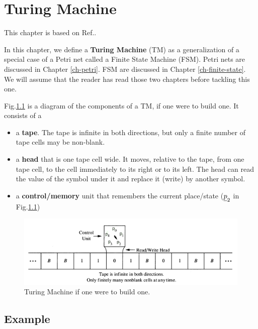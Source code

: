 \chapter{Turing Machine}
\label{ch-turing}

\newcommand{\TA}[0]{\Sigma^+}

This chapter is based on Ref.\cite{wiki-turing-machine}.

In this chapter, we define a {\bf Turing Machine} (TM) as
 a generalization
of a special case of a Petri net called a Finite
State Machine (FSM).
Petri nets are discussed in Chapter \ref{ch-petri}. FSM are discussed
in Chapter \ref{ch-finite-state}. We will assume
that the reader has read those two chapters before tackling this one.

Fig.\ref{fig-turing-phsical} is
a diagram of the components
of a TM, if one were to build one.
It consists of a 
\begin{itemize}
\item
a {\bf tape}. The tape is infinite in both directions,
but only a finite number of tape cells may be non-blank.
\item
a {\bf head}
that is one tape cell wide. It moves, relative to the tape,  from one tape cell, 
to the cell immediately to its right or to its left.
The head can read the value of the symbol under it and replace
it (write) by another symbol.
\item a {\bf control/memory} unit that remembers 
the current place/state ($\rvp_2$ in Fig.\ref{fig-turing-phsical})
\end{itemize}

\begin{figure}[h!]
\centering
\includegraphics[width=6in]
{turing/turing-physical.jpg}
\caption{Turing Machine if one were to build one.}
\label{fig-turing-phsical}
\end{figure}

\section{Example}


